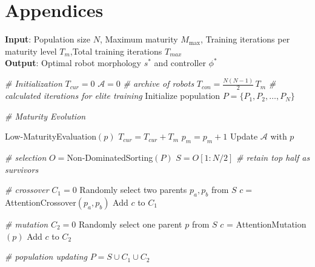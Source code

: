 \documentclass{article}
\begin{document}
    \section*{Appendices}
    \begin{algorithm}
        [H]
        \caption{Pseudocode of AGCD}
        \label{alg:AGCD_pseudocode}

        \textbf{Input}: Population size $N$, Maximum maturity $M_{\max}$,
        Training iterations per maturity level $T_{{m}}$,Total training
        iterations $T_{{max}}$\\
        \textbf{Output}: Optimal robot morphology $s^{*}$ and controller $\phi^{*}$

        \begin{algorithmic}
            [1]

            \item[] \textit{\# Initialization} \STATE $T_{{cur}}= 0$ \STATE $\mathcal{A}
            =0$ \textit{\# archive of robots} \STATE
            $T_{{con}}= \frac{N(N-1)}{2}\,T_{{m}}$ \textit{\# calculated
            iterations for elite training} \STATE Initialize population $P = \{P_{1}
            , P_{2}, \dots, P_{N}\}$

            \item[] \textit{\# Maturity Evolution} 

             \STATE Low-MaturityEvaluation$(p)$ \STATE
            $T_{{cur}}= T_{{cur}}+ T_{{m}}$ \STATE $p_{m}=p_{m}+1$ \STATE Update
            $\mathcal{A}$ with $p$ \ENDFOR

            \item[] \textit{\# selection} \STATE $O =$Non-DominatedSorting$(P)$ \STATE
            $S = O[1:N/2]$ \textit{\# retain top half as survivors}

            \item[] \textit{\# crossover} \STATE $C_{1}=0$ 
            \STATE Randomly select two parents $p_{a}, p_{b}$ from $S$ \STATE $c
            =${AttentionCrossover}$(p_{a}, p_{b})$ \STATE Add $c$ to $C_{1}$ \ENDWHILE

            \item[] \textit{\# mutation} \STATE $C_{2}=0$ 
            \STATE Randomly select one parent $p$ from $S$ \STATE $c$ =
            {AttentionMutation}$(p)$ \STATE Add $c$ to $C_{2}$ \ENDWHILE

            \item[] \textit{\# population updating} \STATE $P = S \cup C_{1}\cup
            C_{2}$


\end{algorithmic}
\end{algorithm}
\end{document}
